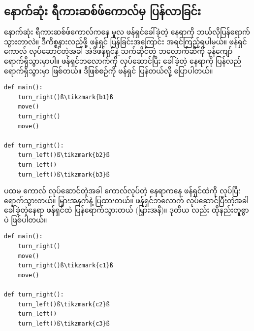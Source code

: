 \subsection*{နောက်ဆုံး ရီကားဆစ်ဖ်ကောလ်မှ ပြန်လာခြင်း}
နောက်ဆုံး ရီကားဆစ်ဖ်ကောလ်ကနေ မူလ ဖန်ရှင်ခေါ်ခဲ့တဲ့ နေရာကို ဘယ်လိုပြန်ရောက်သွားတာလဲ။ ဒီကိစ္စနားလည်ဖို့ ဖန်ရှင်  ပြန်ခြင်းအကြောင်း အရင်ကြည့်ရပါမယ်။ ဖန်ရှင်ကောလ် လုပ်ဆောင်တဲ့အခါ အဲဒီဖန်ရှင်နဲ့ သက်ဆိုင်တဲ့ ဘလောက်ဆီကို ခုန်ကျော် ရောက်ရှိသွားမှာပါ။ ဖန်ရှင်ဘလောက်ကို လုပ်ဆောင်ပြီး ခေါ်ခဲ့တဲ့ နေရာကို ပြန်လည်ရောက်ရှိသွားမှာ ဖြစ်တယ်။ ဒီဖြစ်စဉ်ကို ဖန်ရှင်  ပြန်တယ်လို့ ပြောပါတယ်။
%
\setlength{\fboxsep}{0pt}
\begin{verbatim}
def main():
    turn_right()ß\tikzmark{b1}ß
    move()
    turn_right()
    move()

def turn_right():
    turn_left()ß\tikzmark{b2}ß
    turn_left()
    turn_left()ß\tikzmark{b3}ß
\end{verbatim}
%
ပထမ  ကောလ် လုပ်ဆောင်တဲ့အခါ ကောလ်လုပ်တဲ့ နေရာကနေ  ဖန်ရှင်ထဲကို  လုပ်ပြီး ရောက်သွားတယ်။ မြှားအနက်နဲ့ ပြထားတယ်။ ဖန်ရှင်ဘလောက် လုပ်ဆောင်ပြီးတဲ့အခါ ခေါ်ခဲ့တဲ့နေရာ  ဖန်ရှင်ထဲ ပြန်ရောက်သွားတယ် (မြှားအနီ)။ ဒုတိယ  လည်း ထိုနည်းတူစွာပဲ ဖြစ်ပါတယ်။


%
\setlength{\fboxsep}{0pt}
\begin{verbatim}
def main():
    turn_right()
    move()
    turn_right()ß\tikzmark{c1}ß
    move()

def turn_right():
    turn_left()ß\tikzmark{c2}ß
    turn_left()
    turn_left()ß\tikzmark{c3}ß
\end{verbatim}
\btwntikzannoandpar

